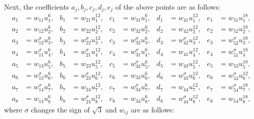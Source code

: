 \documentclass[11pt]{amsart}
\begin{document}
Next, the coefficients  $a_j, b_j, c_j, d_j, e_j$ of the above  points
are as follows: 	 
\begin{align*}
	a_1&=w_{11} u_1^6, & 	b_1&=w_{21}  u_1^{12},& c_1&=w_{31}  u_1^6,& 	d_1 &= w_{41} u_1^{12},& 	e_1&= w_{51} u_1^{18},\\
	a_2&=w_{12} u_2^6,&	b_2&=  w_{22}  u_2^{12}, & 	c_2&= w_{32} u_2^6,& 	d_2 &= w_{42} u_2^{12},& 	e_2&=w_{52} u_2^{18},\\
	a_3&=w_{12}^\sigma u_3^6, &b_3 &=  w_{22}^\sigma  u_3^{12},&c_3&= w_{32}^\sigma  u_3^6,&d_3 &= w_{42}^\sigma  u_3^{12},&
	e_3&= w_{52}^\sigma u_3^{18},\\ 
	a_4&=w_{11}^\sigma u_4^6,& b_4 &= w_{21}^\sigma u_4^{12},& c_4&=  w_{31}^\sigma u_4^6,& d_4 &= w_{41}  u_4^{12},&
	e_4&= w_{51}^\sigma u_4^{18}\\
	a_5&=  w_{13} u_5^6,&  b_5 &= w_{23} u_5^{12},& c_5&= w_{33}^\sigma u_5^6,& d_5 &= w_{43} u_5^{12},& e_5&= w_{53} u_5^{18},\\ 
	a_6&= w_{13}^\sigma  u_6^6,& b_6 &= w_{23}^\sigma  u_6^{12},& c_6&=  w_{33}  u_6^6,& d_6 &=w_{43}^\sigma u_6^{12},& e_6 &=w_{53}^\sigma u_6^{12},\\
	a_7&= w_{14}^\sigma u_7^6,& 	b_7 &=w_{24} u_7^{12},& c_7&= w_{34}^\sigma u_7^6,& d_7 &=  w_{44} u_7^{12},&e_7&= w_{54}^\sigma u_7^{18},\\
	a_8&=  w_{14} u_8^6& b_8 &=  w_{24}^\sigma u_8^{12},& c_8&=   w_{34} u_8^6,& d_8 &= w_{44}^\sigma u_8^{12},& e_8&= w_{54} 	u_8^{18},
\end{align*}
where $\sigma$   changes the sign of $\sqrt{3}$ and $w_{ij}$ are as follows:
\end{document}
